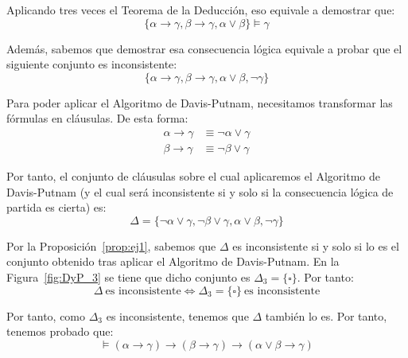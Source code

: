 \begin{ejemplo}
\begin{enumerate}

             Aplicando tres veces el Teorema de la Deducción, eso equivale a demostrar que:
            \begin{equation*}
                \{\alpha \rightarrow \gamma, \beta \rightarrow \gamma, \alpha \vee \beta\} \vDash \gamma
            \end{equation*}

            Además, sabemos que demostrar esa consecuencia lógica equivale a probar que el siguiente conjunto es inconsistente:
            \begin{equation*}
                \{\alpha \rightarrow \gamma, \beta \rightarrow \gamma, \alpha \vee \beta, \neg \gamma\}
            \end{equation*}

            Para poder aplicar el Algoritmo de Davis-Putnam, necesitamos transformar las fórmulas en cláusulas. De esta forma:
            \begin{align*}
                \alpha \rightarrow \gamma &\equiv \neg \alpha \vee \gamma\\
                \beta \rightarrow \gamma &\equiv \neg \beta \vee \gamma
            \end{align*}

            Por tanto, el conjunto de cláusulas sobre el cual aplicaremos el Algoritmo de Davis-Putnam (y el cual será inconsistente si y solo si la consecuencia lógica de partida es cierta) es:
            \begin{equation*}
                \Delta = \{\neg \alpha \vee \gamma, \neg \beta \vee \gamma, \alpha \vee \beta, \neg \gamma\}
            \end{equation*}

            Por la Proposición~\ref{prop:ej1}, sabemos que $\Delta$ es inconsistente si y solo si lo es el conjunto obtenido tras aplicar el Algoritmo de Davis-Putnam.
            En la Figura~\ref{fig:DyP_3} se tiene que dicho conjunto es $\Delta_3=\{\square\}$. Por tanto:
            \begin{equation*}
                \Delta\ \text{es inconsistente} \iff \Delta_3=\{\square\}\ \text{es inconsistente}
            \end{equation*}

            Por tanto, como $\Delta_3$ es inconsistente, tenemos que $\Delta$ también lo es. Por tanto, tenemos probado que:
            \begin{equation*}
                \vDash \left(\alpha \rightarrow \gamma\right) \rightarrow \left(\beta \rightarrow \gamma\right) \rightarrow \left(\alpha \vee \beta \rightarrow \gamma\right)
            \end{equation*}


\end{enumerate}
\end{ejemplo}
